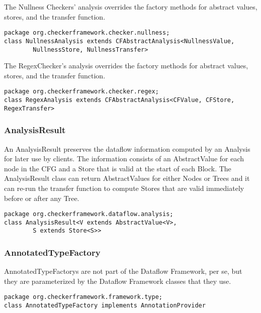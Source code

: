 The Nullness Checkers' analysis overrides the factory methods for
abstract values, stores, and the transfer function.

\begin{verbatim}
package org.checkerframework.checker.nullness;
class NullnessAnalysis extends CFAbstractAnalysis<NullnessValue,
        NullnessStore, NullnessTransfer>
\end{verbatim}

The RegexChecker's analysis overrides the factory methods for abstract
values, stores, and the transfer function.

\begin{verbatim}
package org.checkerframework.checker.regex;
class RegexAnalysis extends CFAbstractAnalysis<CFValue, CFStore, RegexTransfer>
\end{verbatim}


\subsubsection{AnalysisResult}
\label{sec:analysis_result_class}

An AnalysisResult preserves the dataflow information computed by an
Analysis for later use by clients.  The information consists of an
AbstractValue for each node in the CFG and a Store that is valid at
the start of each Block.  The AnalysisResult class can return
AbstractValues for either Nodes or Trees and it can re-run the
transfer function to compute Stores that are valid immediately before
or after any Tree.

\begin{verbatim}
package org.checkerframework.dataflow.analysis;
class AnalysisResult<V extends AbstractValue<V>,
        S extends Store<S>>
\end{verbatim}


\subsubsection{AnnotatedTypeFactory}
\label{sec:annotated_type_factory_classes}

AnnotatedTypeFactorys are not part of the Dataflow Framework, per se,
but they are parameterized by the Dataflow Framework classes that they
use.

\begin{verbatim}
package org.checkerframework.framework.type;
class AnnotatedTypeFactory implements AnnotationProvider
\end{verbatim}

